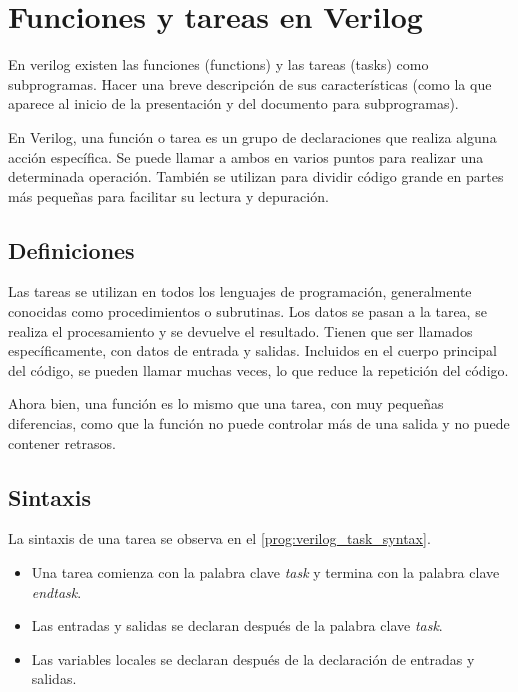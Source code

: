 \section{Funciones y tareas en Verilog \label{sec:s2}}

\begin{center}
	\begin{minipage}{12cm}
		\begin{tcolorbox}[title=Actividad 2]
			En verilog existen las funciones (functions) y las tareas (tasks) como subprogramas. Hacer una breve descripción de sus características (como la que aparece al inicio de la presentación y del documento para subprogramas).
		\end{tcolorbox}	
	\end{minipage}
\end{center}

En Verilog, una función o tarea es un grupo de declaraciones que realiza alguna acción específica. Se puede llamar a ambos en varios puntos para realizar una determinada operación. También se utilizan para dividir código grande en partes más pequeñas para facilitar su lectura y depuración. \cite{vlsiverify}

\subsection{Definiciones}

Las tareas se utilizan en todos los lenguajes de programación, generalmente conocidas como procedimientos o subrutinas. Los datos se pasan a la tarea, se realiza el procesamiento y se devuelve el resultado. Tienen que ser llamados específicamente, con datos de entrada y salidas. Incluidos en el cuerpo principal del código, se pueden llamar muchas veces, lo que reduce la repetición del código.
	
Ahora bien, una función es lo mismo que una tarea, con muy pequeñas diferencias, como que la función no puede controlar más de una salida y no puede contener retrasos. 

\subsection{Sintaxis}

La sintaxis de una tarea se observa en el \autoref{prog:verilog_task_syntax}.

\begin{itemize}
	\item Una tarea comienza con la palabra clave \textit{task} y termina con la palabra clave \textit{endtask}.
	\item Las entradas y salidas se declaran después de la palabra clave \textit{task}.
	\item Las variables locales se declaran después de la declaración de entradas y salidas. \cite{asic_2014} 
\end{itemize}


